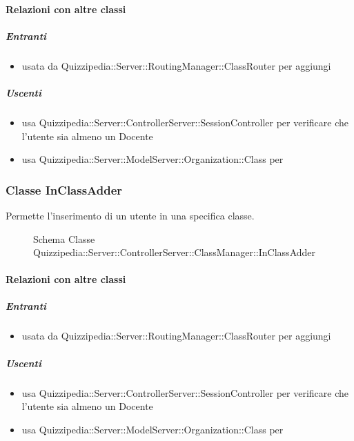 \paragraph{Relazioni con altre classi}
\subparagraph{Entranti}
\begin{itemize}
\item usata da Quizzipedia::Server::RoutingManager::ClassRouter per aggiungi
\end{itemize}
\subparagraph{Uscenti}
\begin{itemize}
\item usa Quizzipedia::Server::ControllerServer::SessionController per verificare che l'utente sia almeno un Docente
\item usa Quizzipedia::Server::ModelServer::Organization::Class per 
\end{itemize}
\subsubsection{Classe InClassAdder}
Permette l'inserimento di un utente in una specifica classe.
\begin{figure}[H]
\centering
\noindent{}
\caption[Schema Classe InClassAdder]{Schema Classe Quizzipedia::Server::ControllerServer::ClassManager::InClassAdder}
\end{figure}
\paragraph{Relazioni con altre classi}
\subparagraph{Entranti}
\begin{itemize}
\item usata da Quizzipedia::Server::RoutingManager::ClassRouter per aggiungi
\end{itemize}
\subparagraph{Uscenti}
\begin{itemize}
\item usa Quizzipedia::Server::ControllerServer::SessionController per verificare che l'utente sia almeno un Docente
\item usa Quizzipedia::Server::ModelServer::Organization::Class per 
\end{itemize}
